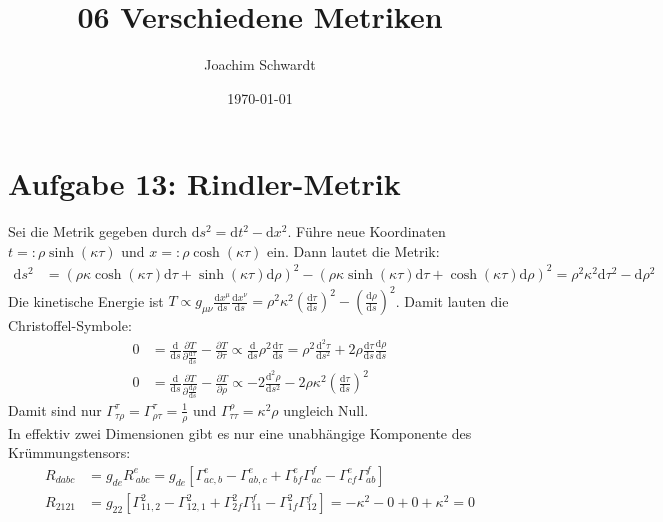 \documentclass[a4paper,12pt]{article}
\newcommand{\kla}{}
\newcommand{\klam}{}
\newcommand{\tecxt}{}
\begin{document}
\title{06 Verschiedene Metriken}
\author{Joachim Schwardt}
\date{\today}
\maketitle


\section*{Aufgabe 13: Rindler-Metrik}
Sei die Metrik gegeben durch $\tecxt\text{d}s^2=\tecxt\text{d}t^2-\tecxt\text{d}x^2$. Führe neue Koordinaten $t=:\rho\sinh (\kappa\tau)$ und $x=:\rho\cosh (\kappa\tau)$ ein. Dann lautet die Metrik:
\begin{align*}
\tecxt\text{d}s^2&=\kla\left( {\rho\kappa\cosh ( \kappa\tau)\tecxt\text{d}\tau + \sinh (\kappa\tau)\tecxt\text{d}\rho} \right)^2-\kla\left( {\rho\kappa\sinh (\kappa\tau)\tecxt\text{d}\tau + \cosh (\kappa\tau)\tecxt\text{d}\rho} \right)^2=\rho^2\kappa^2\tecxt\text{d}\tau^2-\tecxt\text{d}\rho^2
\end{align*}
Die kinetische Energie ist $T\propto g_{\mu\nu}\frac{\tecxt\text{d}x^\mu }{\tecxt\text{d}s}\frac{\tecxt\text{d}x^\nu }{\tecxt\text{d}s}=\rho^2\kappa^2\kla\left( {\frac{\tecxt\text{d}\tau}{\tecxt\text{d}s}} \right)^2 - \kla\left( {\frac{\tecxt\text{d}\rho}{\tecxt\text{d}s}} \right)^2$. Damit lauten die Christoffel-Symbole:
\begin{align*}
0&=\frac{\tecxt\text{d}}{\tecxt\text{d}s}\frac{\partial T}{\partial\frac{\tecxt\text{d}\tau }{\tecxt\text{d}s}} - \frac{\partial T}{\partial \tau}\propto \frac{\tecxt\text{d}}{\tecxt\text{d}s}\rho^2\frac{\tecxt\text{d}\tau}{\tecxt\text{d}s}=\rho^2\frac{\tecxt\text{d}^2\tau}{\tecxt\text{d}s^2} + 2\rho\frac{\tecxt\text{d}\tau}{\tecxt\text{d}s}\frac{\tecxt\text{d}\rho}{\tecxt\text{d}s}\\
0&=\frac{\tecxt\text{d}}{\tecxt\text{d}s}\frac{\partial T}{\partial \frac{\tecxt\text{d}\rho}{\tecxt\text{d}s}}-\frac{\partial T}{\partial\rho}\propto -2\frac{\tecxt\text{d}^2\rho}{\tecxt\text{d}s^2}-2\rho\kappa^2\kla\left( {\frac{\tecxt\text{d}\tau}{\tecxt\text{d}s}} \right)^2
\end{align*}
Damit sind nur $\Gamma^\tau_{\tau\rho}=\Gamma^\tau_{\rho\tau}=\frac{1}{\rho}$ und $\Gamma^\rho_{\tau\tau}=\kappa^2\rho$ ungleich Null.\\
In effektiv zwei Dimensionen gibt es nur eine unabhängige Komponente des Krümmungstensors:
\begin{align*}
R_{dabc}&=g_{de}R^e_{\ abc}=g_{de}\klam\left[ {\Gamma^e_{ac,b}-\Gamma^e_{ab,c}+\Gamma^e_{bf}\Gamma^f_{ac}-\Gamma^e_{cf}\Gamma^f_{ab}} \right]\\
R_{2121}&=g_{22}\klam\left[ {\Gamma^2_{11,2}-\Gamma^2_{12,1}+\Gamma^2_{2f}\Gamma^f_{11}-\Gamma^2_{1f}\Gamma^f_{12}} \right]=-\kappa^2-0+0+\kappa^2= 0
\end{align*}
\end{document}
